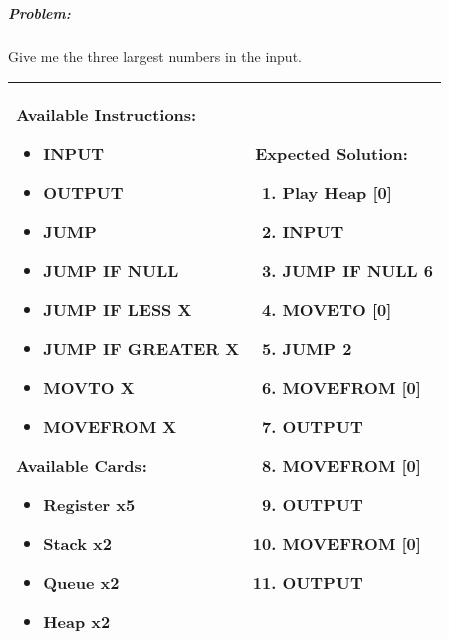 \subparagraph{Problem:} Give me the three largest numbers in the input.

\begin{center}
    \begin{tabular}{ | m{5cm} | m{9cm} | } 
        \hline
            \textbf{Available Instructions:} 
            \begin{itemize}
                \setlength\itemsep{-.35em}
                \item INPUT
                \item OUTPUT
                \item JUMP
                \item JUMP IF NULL
                \item JUMP IF LESS X
                \item JUMP IF GREATER X
                \item MOVTO X
                \item MOVEFROM X
            \end{itemize}
            \textbf{Available Cards:} 
            \begin{itemize}
                \setlength\itemsep{-.35em}
                \item Register x5
                \item Stack x2
		\item Queue x2
		\item Heap x2
            \end{itemize}& 
            \textbf{Expected Solution:} 
            \begin{enumerate}
                \setlength\itemsep{-.60em}
                \item Play Heap [0]
                \item INPUT
                \item JUMP IF NULL 6
                \item MOVETO [0]
                \item JUMP 2
                \item MOVEFROM [0]
                \item OUTPUT
                \item MOVEFROM [0]
                \item OUTPUT
                \item MOVEFROM [0]
                \item OUTPUT
            \end{enumerate}
            \\
        \hline
    \end{tabular}
\end{center}


